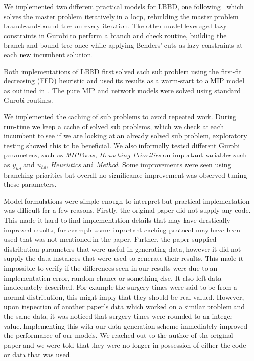 We implemented two different practical models for LBBD, one following~\cite{roshanaei2017propagating} which solves the master problem iteratively in a loop, rebuilding the master problem branch-and-bound tree on every iteration. The other model leveraged lazy constraints in Gurobi to perform a branch and check routine\cite{LBBDBible}, building the branch-and-bound tree once while applying Benders' cuts as lazy constraints at each new incumbent solution. 

Both implementations of LBBD first solved each sub problem using the first-fit decreasing (FFD) heuristic\cite{Fazel} and used its results as a warm-start to a MIP model as outlined in~\cite{roshanaei2017propagating}. The pure MIP and network models were solved using standard Gurobi routines. 

We implemented the caching of sub problems to avoid repeated work. During run-time we keep a cache of solved sub problems, which we check at each incumbent to see if we are looking at an already solved sub problem, exploratory testing showed this to be beneficial. We also informally tested different Gurobi parameters, such as \textit{MIPFocus}, \textit{Branching Priorities} on important variables such as $y_{hd}$ and $u_{hd}$, \textit{Heuristics} and \textit{Method}. Some improvements were seen using branching priorities but overall no significance improvement was observed tuning these parameters. 

Model formulations were simple enough to interpret but practical implementation was difficult for a few reasons. Firstly, the original paper did not supply any code. This made it hard to find implementation details that may have drastically improved results, for example some important caching protocol may have been used that was not mentioned in the paper. Further, the paper supplied distribution parameters that were useful in generating data, however it did not supply the data instances that were used to generate their results. This made it impossible to verify if the differences seen in our results were due to an implementation error, random chance or something else. It also left data inadequately described. For example the surgery times were said to be from a normal distribution, this might imply that they should be real-valued. However, upon inspection of another paper's data which worked on a similar problem\cite{guo} and the same data, it was noticed that surgery times were rounded to an integer value. Implementing this with our data generation scheme immediately improved the performance of our models. We reached out to the author of the original paper and we were told that they were no longer in possession of either the code or data that was used. 

